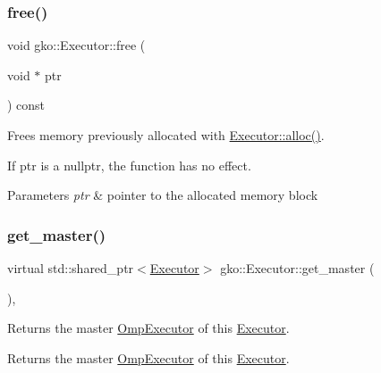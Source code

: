 \subsubsection{\texorpdfstring{free()}{free()}}
{\footnotesize\ttfamily void gko\+::\+Executor\+::free (\begin{DoxyParamCaption}\item[{void $\ast$}]{ptr }\end{DoxyParamCaption}) const\hspace{0.3cm}{\ttfamily [noexcept]}}



Frees memory previously allocated with \hyperlink{classgko_1_1Executor_a5a216c2b1f7ceb8a0190c08941c1c687}{Executor\+::alloc()}. 

If {\ttfamily ptr} is a {\ttfamily nullptr}, the function has no effect.


\begin{DoxyParams}{Parameters}
{\em ptr} & pointer to the allocated memory block \\
\hline
\end{DoxyParams}
\mbox{\label{classgko_1_1Executor_acaec4f999d52fc71e5e5a3d3ad93609c}} 
\subsubsection{\texorpdfstring{get\+\_\+master()}{get\_master()}\hspace{0.1cm}{\footnotesize\ttfamily [1/2]}}
{\footnotesize\ttfamily virtual std\+::shared\+\_\+ptr$<$\hyperlink{classgko_1_1Executor}{Executor}$>$ gko\+::\+Executor\+::get\+\_\+master (\begin{DoxyParamCaption}{ }\end{DoxyParamCaption})\hspace{0.3cm}{\ttfamily [pure virtual]}, {\ttfamily [noexcept]}}



Returns the master \hyperlink{classgko_1_1OmpExecutor}{Omp\+Executor} of this \hyperlink{classgko_1_1Executor}{Executor}. 

\begin{DoxyReturn}{Returns}
the master \hyperlink{classgko_1_1OmpExecutor}{Omp\+Executor} of this \hyperlink{classgko_1_1Executor}{Executor}. 
\end{DoxyReturn}


